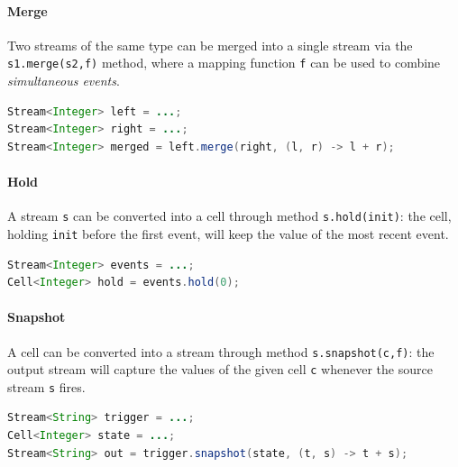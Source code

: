 
\paragraph{Merge}
Two streams of the same type can be merged into a single stream via the \texttt{s1.merge(s2,f)} method,
 where a mapping function \texttt{f} can be used to combine \emph{simultaneous events}. 
%
%
\begin{lstlisting}[frame=single, language=java]
Stream<Integer> left = ...;
Stream<Integer> right = ...;
Stream<Integer> merged = left.merge(right, (l, r) -> l + r);
\end{lstlisting}

\paragraph{Hold}
A stream \texttt{s} can be converted into a cell through method \lstinline[breaklines=true]|s.hold(init)|: the cell, holding \texttt{init} before the first event, will keep the value of the most recent event.
%
\begin{lstlisting}[frame=single, language=java]
Stream<Integer> events = ...;
Cell<Integer> hold = events.hold(0);
\end{lstlisting}

\paragraph{Snapshot}
A cell can be converted into a stream
 through method \texttt{s.snapshot(c,f)}:
 the output stream will capture the values of the given cell \texttt{c} whenever the source stream \texttt{s} fires.
%
%
\begin{lstlisting}[frame=single, language=java]
Stream<String> trigger = ...;
Cell<Integer> state = ...;
Stream<String> out = trigger.snapshot(state, (t, s) -> t + s);
\end{lstlisting}

